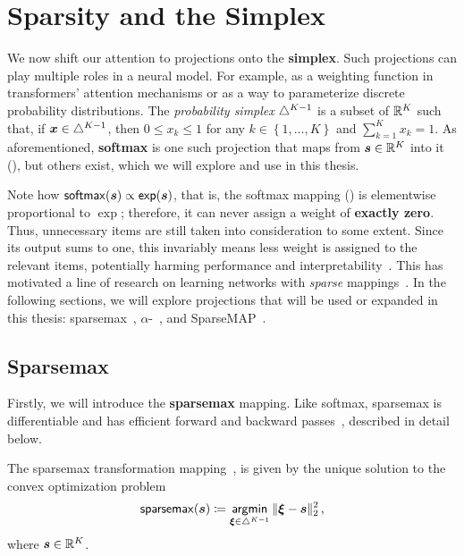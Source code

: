 \section{Sparsity and the Simplex}
\label{sec:sparsity_background}

\noindent We now shift our attention to projections onto the
\textbf{simplex}. Such projections can play multiple roles in a neural model.
For example, as a weighting function in transformers' attention mechanisms
or as a way to parameterize discrete probability distributions.
The \textit{probability simplex} $\triangle^{K-1}$
is a subset of $\mathbb{R}^K$ such that, if $\bm{x}\in\triangle^{K-1}$,
then $0 \leq x_k \leq 1$ for any $k\in\left\{1, \dots, K\right\}$ and
$\sum_{k=1}^K x_k = 1$. As aforementioned, \textbf{softmax} is one
such projection that maps from $\bm{s}\in\mathbb{R}^K$ into it
(), but others exist, which we will explore and
use in this thesis.

Note how $\operatorname*{\mathsf{softmax}}(\bm{s}) \propto \operatorname*{\mathsf{exp}}(\bm{s})$, that is, the softmax
mapping () is elementwise proportional to $\exp$;
therefore, it can never assign a weight of \textbf{exactly zero}.
Thus, unnecessary items are still taken into consideration to some
extent. Since its output sums to one, this invariably means less
weight is assigned to the relevant items, potentially harming
performance and interpretability~\citep{jain2019attention}. This has
motivated a line of research on learning networks with \emph{sparse}
mappings~\citep{sparsemax,fusedmax,louizos,shao2019ssn}. In the
following sections, we will explore projections that will be used or
expanded in this thesis: sparsemax~\citep{sparsemax},
$\alpha$-\entmaxtext~\citep{blondel2019learning,entmax}, and
SparseMAP~\citep{sparsemap}.

\subsection{Sparsemax}\label{sec:sparsemax_bg}

\noindent Firstly, we will introduce the \textbf{sparsemax} mapping.
Like softmax, sparsemax is differentiable and has efficient forward and backward
passes~\citep{Held1974,sparsemax}, described in detail below.

\begin{definition}[sparsemax]
    The sparsemax transformation
    mapping~\citep{sparsemax}, is given by the unique solution
    to the convex optimization problem
    \begin{equation}\label{eq:sparsemax}
        \operatorname*{\mathsf{sparsemax}}(\bm{s}) \coloneqq \operatorname*{\mathsf{argmin}}_{\bm{\xi} \in \triangle^{K-1}} \| \bm{\xi} - \bm{s} \|_2^2\,,
    \end{equation}
    where $\bm{s}\in\mathbb{R}^K$.
\end{definition}

